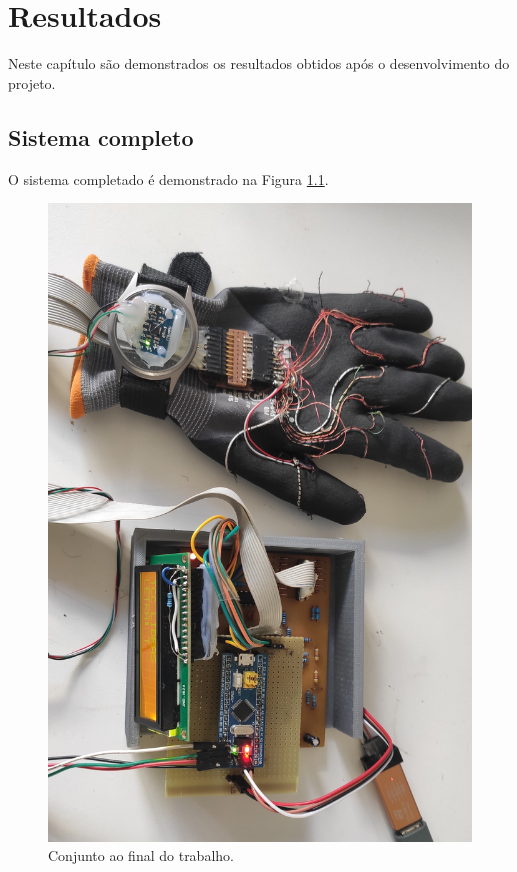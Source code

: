 \chapter{Resultados}
Neste capítulo são demonstrados os resultados obtidos após o desenvolvimento do projeto.
\section{Sistema completo}

 O sistema completado é demonstrado na Figura \ref{fig:luvaMontada}.

\begin{figure}[H]
	\centering
	\includegraphics[scale=0.1]{imagens/conjuntoFinal.jpg}
	\caption{Conjunto ao final do trabalho.}
	\label{fig:luvaMontada}
\end{figure}

